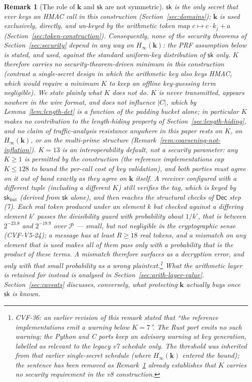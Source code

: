 \documentclass[11pt,a4paper]{article}
\newtheorem{remark}[theorem]{Remark}
\begin{document}
\begin{remark}[The role of $\mathbf{k}$ and $\mathsf{sk}$ are not symmetric]
\label{rem:key-roles}
$\mathsf{sk}$ is the \emph{only} secret that ever keys an HMAC call in this
construction (Section~\ref{sec:domains}); $\mathbf{k}$ is used exclusively,
directly, and un-keyed by the arithmetic token map $c \mapsto c\cdot k_j+a$
(Section~\ref{sec:token-construction}). Consequently, none of the security
theorems of Section~\ref{sec:security} depend in any way on
$H_\infty(\mathbf{k})$: the PRF assumption below is stated, and used,
against the standard \emph{uniform}-key distribution of $\mathsf{sk}$ only.
$K$ therefore carries no security-theorem-driven minimum in this
construction (contrast a single-secret design in which the arithmetic key
also keys HMAC, which would require a minimum $K$ to keep an offline
key-guessing term negligible). We state plainly what $K$ does \emph{not}
do. $K$ is never transmitted, appears nowhere in the wire format, and does
not influence $|C|$, which by Lemma~\ref{lem:length-det} is a function of
the padding bucket alone; in particular $K$ makes no contribution to the
length-hiding property of Section~\ref{sec:length-hiding}, and no claim of
traffic-analysis resistance anywhere in this paper rests on $K$, on
$H_\infty(\mathbf{k})$, or on the multi-prime structure
(Remark~\ref{rem:coarsening-not-inflation}). $K=13$ is an interoperability
default, not a security parameter: any $K\ge1$ is permitted by the
construction (the reference implementations cap $K\le128$ to bound the
per-call cost of key validation), and both parties must agree on it out of band exactly as they
agree on $\mathbf{k}$ itself. A receiver configured with a different tuple
(including a different $K$) still verifies the tag, which is keyed by
$\mathsf{sk}_{\mathrm{fmt}}$ (derived from $\mathsf{sk}$ alone), and
then reaches the structural checks of $\mathsf{Dec}$ step (7). Each real
token produced under an element $k$ but checked against a differing element
$k'$ passes the divisibility guard with probability about $1/k'$, that is
between $2^{-23.8}$ and $2^{-19.9}$ over $\mathcal{P}$ — small, but not
negligible in the cryptographic sense (CVF-V5-24); a message has at least
$R\ge18$ real tokens, and a mismatch on any element that is used makes all
of them pass only with a probability that is the product of these terms.
A mismatch therefore surfaces as a decryption error, and only with that
small probability as a wrong plaintext.\footnote{CVF-36: an earlier revision of this
remark stated that ``the reference implementations emit a warning below
$K=7$''. The Rust port emits no such warning; the Python and C ports keep
an advisory warning at key generation, labelled as relevant to the legacy
v7 schedule only. The threshold was inherited from that earlier
single-secret schedule (where $H_\infty(\mathbf{k})$ entered the bound);
the sentence has been removed as Remark~\ref{rem:key-roles} already
establishes that $K$ carries no security requirement in the v8
construction.} What the arithmetic layer is retained
for instead is analysed in Section~\ref{sec:arith-layer-value}.
Section~\ref{sec:caveats} discusses,
conversely, what protecting $\mathbf{k}$ actually buys once $\mathsf{sk}$
is known.
\end{remark}
\end{document}
